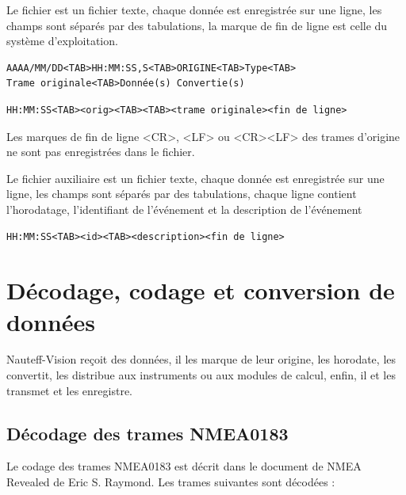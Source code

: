 \documentclass[a4paper,11pt]{report}
\begin{document}
Le fichier est un fichier texte, chaque donnée est enregistrée sur une ligne,
les champs sont séparés par des tabulations,
la marque de fin de ligne est celle du système d'exploitation.

\begin{verbatim}
AAAA/MM/DD<TAB>HH:MM:SS,S<TAB>ORIGINE<TAB>Type<TAB>
Trame originale<TAB>Donnée(s) Convertie(s)
\end{verbatim}


\begin{verbatim}
HH:MM:SS<TAB><orig><TAB><TAB><trame originale><fin de ligne>
\end{verbatim}
Les marques de fin de ligne <CR>, <LF> ou <CR><LF> des trames d'origine ne sont pas enregistrées dans le fichier.


Le fichier auxiliaire est un fichier texte, chaque donnée est enregistrée sur une ligne,
les champs sont séparés par des tabulations, chaque ligne contient l'horodatage, l'identifiant de l'événement et la description de l'événement

\begin{verbatim}
HH:MM:SS<TAB><id><TAB><description><fin de ligne>
\end{verbatim}






\section{Décodage, codage et conversion de données}

Nauteff-Vision reçoit des données, il les marque de leur origine,
les horodate, les convertit, les distribue aux instruments ou aux modules de calcul, enfin, il et les transmet et les enregistre.

\subsection{Décodage des trames NMEA0183}
Le codage des trames NMEA0183 est décrit dans le document de NMEA Revealed de Eric S. Raymond.
Les trames suivantes sont décodées :
\end{document}
